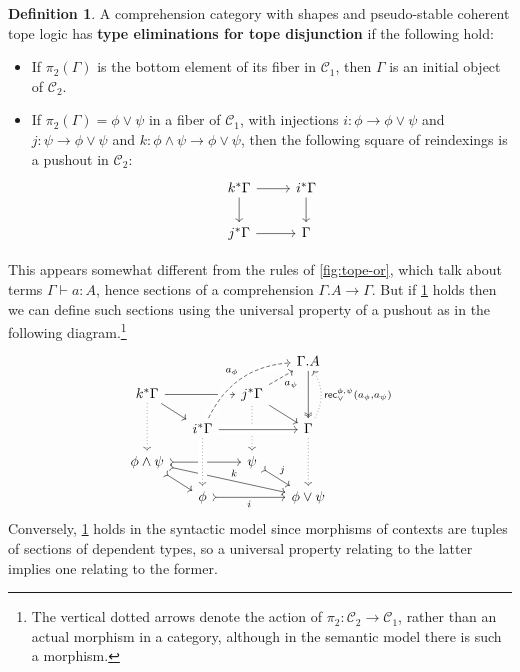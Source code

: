 \documentclass{amsart}
\theoremstyle{plain}
\theoremstyle{definition}
\newtheorem{defn}[thm]{Definition}
\theoremstyle{remark}
\numberwithin{equation}{section}
\newcommand{\types}{\vdash}
\newcommand{\rec}{\mathsf{rec}}
\newcommand{\C}{\mathcal{C}}
\begin{document}
\begin{defn}\label{defn:cc-reclor}
  A comprehension category with shapes and pseudo-stable coherent tope logic has \textbf{type eliminations for tope disjunction} if the following hold:
  \begin{itemize}
  \item If $\pi_2(\Gamma)$ is the bottom element of its fiber in $\C_1$, then $\Gamma$ is an initial object of $\C_2$.
  \item If $\pi_2(\Gamma) = \phi\lor\psi$ in a fiber of $\C_1$, with injections $i:\phi\to\phi\lor\psi$ and $j:\psi\to\phi\lor\psi$ and $k:\phi\land\psi\to\phi\lor\psi$, then the following square of reindexings is a pushout in $\C_2$:
    \[
    \begin{tikzcd}
      k^*\Gamma \ar[r] \ar[d] & i^*\Gamma \ar[d] \\ j^*\Gamma \ar[r] & \Gamma
    \end{tikzcd}
    \]
  \end{itemize}
\end{defn}

This appears somewhat different from the rules of \cref{fig:tope-or}, which talk about terms $\Gamma\types a:A$, hence sections of a comprehension $\Gamma.A\to \Gamma$.
But if \cref{defn:cc-reclor} holds then we can define such sections using the universal property of a pushout as in the following diagram.\footnote{The vertical dotted arrows denote the action of $\pi_2 : \C_2\to \C_1$, rather than an actual morphism in a category, although in the semantic model there is such a morphism.}
\[
\begin{tikzcd}[row sep=small,column sep=small]
& & & \Gamma.A \arrow[dd, two heads] \\ 
k^*\Gamma \arrow[rr] \arrow[dr] \arrow[dd, dotted] & & j^*\Gamma \arrow[dr] \arrow[ur, dashed, "a_\psi"'] \arrow[dd,dotted] \\ & i^*\Gamma \arrow[rr, crossing over] \arrow[uurr, bend left, crossing over, dashed, "a_\phi"] & & \Gamma \arrow[dd,dotted] \arrow[uu, bend right, dotted, "{\rec_\lor^{\phi,\psi}(a_\phi,a_\psi)}"'] \\ 
{\phi\land \psi} \arrow[rr, tail] \arrow[dr, tail] \arrow[drrr, tail, "k"] & & {\psi} \arrow[dr, tail, "j"]  \\ 
& {\phi} \arrow[rr, tail, "i"'] \arrow[from=uu, dotted, crossing over] & & {\phi \lor \psi}
\end{tikzcd}
\]
Conversely, \cref{defn:cc-reclor} holds in the syntactic model since morphisms of contexts are tuples of sections of dependent types, so a universal property relating to the latter implies one relating to the former.
\end{document}
